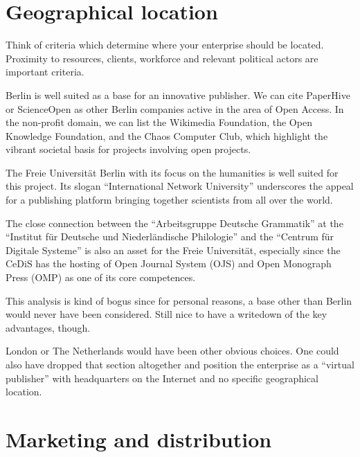 \documentclass[nonflat,smallfont
]{langsci/langscibook}
\newcommand{\background}[1]{ 
  \vspace{5mm}
  \renewcommand{\tblslinecolour}{lsDarkBlue}
  \tblssy[red]{explore2}{Background}{\vspace*{-5mm}#1}
}
\newcommand{\langscisolution}[1]{
  \renewcommand{\tblslinecolour}{lsLightBlue}
  \tblssy{langsci}{LangSci solution}{\vspace*{-5mm}#1}
}
\newcommand{\evaluation}[1]{
  \renewcommand{\tblslinecolour}{lsLightOrange}
  \tblssy{receipt}{Evaluation}{\vspace*{-5mm}#1}
}
\newcommand{\othersolutions}[1]{
  \renewcommand{\tblslinecolour}{lsDarkGreenOne}
  \tblssy{more}{Other solutions}{\vspace*{-5mm}#1}
}
\renewcommand{\tblssy}[4][black!12]{%
  \renewcommand{\langscisymbol}{#2}\renewcommand{\tblsboxcolor}{#1}
  \begin{mdframed}[style=yellowexercise,frametitle={#3}]
    #4
  \end{mdframed}
}
\begin{document}
\section{Geographical location}

\background{Think of criteria which determine where your enterprise should be located. Proximity to resources, clients, workforce and relevant political actors are important criteria.}
\langscisolution{
Berlin is well suited as a base for an innovative publisher. We can cite PaperHive or ScienceOpen as other Berlin companies active in the area of Open Access. In the non-profit domain, we can list the Wikimedia Foundation, the Open Knowledge Foundation, and the Chaos Computer Club, which highlight the vibrant societal basis for projects involving open projects. 

The Freie Universität Berlin with its focus on the humanities is well suited for this project. Its slogan ``International Network University'' underscores the appeal for a publishing platform bringing together scientists from all over the world. 

The close connection between the ``Arbeitsgruppe Deutsche Grammatik'' at the ``Institut für Deutsche und Niederländische Philologie'' and the ``Centrum für Digitale Systeme'' is also an asset for the Freie Universität, especially since the CeDiS has the hosting of Open Journal System (OJS) and Open Monograph Press (OMP) as one of its core competences.
}
\evaluation{This analysis is kind of bogus since for personal reasons, a base other than Berlin would never have been considered. Still nice to have a writedown of the key advantages, though.}
\othersolutions{London or The Netherlands would have been other obvious choices. One could also have dropped that section altogether and position the enterprise as a ``virtual publisher'' with headquarters on the Internet and no specific geographical location.}
 

\section{Marketing and distribution}
\end{document}
